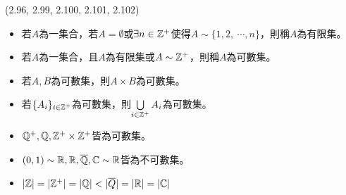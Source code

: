 \item \begin{theorem}{(2.96, 2.99, 2.100, 2.101, 2.102)} \quad\quad
    \begin{itemize}
        \item 若$A$為一集合，若$A = \emptyset$或$\exists n \in \mathbb{Z}^+$使得$A \sim \{1, 2, \ \cdots, n\}$，則稱$A$為有限集。
        \item 若$A$為一集合，且$A$為有限集或$A \sim \mathbb{Z}^+$，則稱$A$為可數集。
        \item 若$A, B$為可數集，則$A \times B$為可數集。
        \item 若$\{A_i\}_{i \in \mathbb{Z}^+}$為可數集，則$\bigcup\limits_{i \in \mathbb{Z}^+}A_i$為可數集。
        \item $\mathbb{Q}^+, \mathbb{Q}, \mathbb{Z}^+ \times \mathbb{Z}^+$皆為可數集。
        \item $(0, 1) \sim \mathbb{R}, \mathbb{R}, \overline{\mathbb{Q}}, \mathbb{C} \sim \mathbb{R}$皆為不可數集。
        \item $|\mathbb{Z}| = |\mathbb{Z}^+| = |\mathbb{Q}| < |\overline{Q}| = |\mathbb{R}| = |\mathbb{C}|$
    \end{itemize}
\end{theorem}
